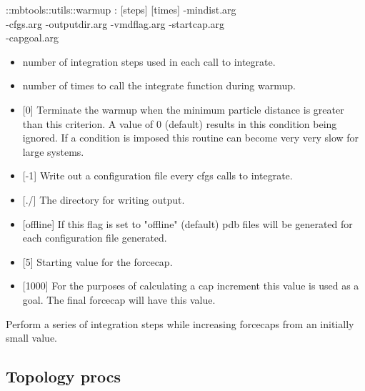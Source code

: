\begin{code}    
  ::mbtools::utils::warmup  :  [steps] [times] -mindist.arg\\
             -cfgs.arg -outputdir.arg -vmdflag.arg -startcap.arg \\
             -capgoal.arg
\end{code}
\begin{itemize}
\item {} number of integration steps used in each call to integrate.
\item {} number of times to call the integrate function during warmup.
\item {} [0] Terminate the warmup when the minimum particle distance is greater than this criterion. A value of 0 (default) results in this condition being ignored. If a condition is imposed this routine can become very very slow for large systems.
\item {} [-1] Write out a configuration file every cfgs calls to integrate.
\item {} [./] The directory for writing output.
\item {} [offline] If this flag is set to "offline" (default) pdb files will be generated for each configuration file generated.
\item {} [5] Starting value for the forcecap.
\item {} [1000] For the purposes of calculating a cap increment this value is used as a goal. The final forcecap will have this value.
\end{itemize}
Perform a series of integration steps while increasing forcecaps from an initially small value.

\subsection{Topology procs}

